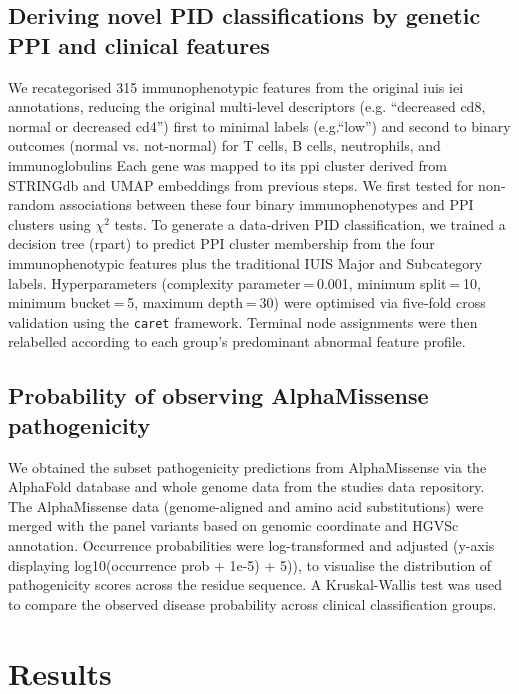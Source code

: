 \subsection{Deriving novel PID classifications by genetic PPI and clinical features}
We recategorised 315 immunophenotypic features from the original \ac{iuis} \ac{iei} annotations, reducing the original multi‐level descriptors (e.g. ``decreased cd8, normal or decreased cd4'') first to 
minimal labels (e.g.``low'') and second to binary outcomes (normal vs. not-normal) for T cells, B cells, neutrophils, and immunoglobulins %
Each gene was mapped to its \ac{ppi} cluster derived from STRINGdb and UMAP embeddings from previous steps. 
We first tested for non‐random associations between these four binary immunophenotypes and PPI clusters using $\chi^2$ tests. %
To generate a data‐driven PID classification, we trained a decision tree (rpart) to predict PPI cluster membership from the four immunophenotypic features plus the traditional IUIS Major and Subcategory labels. Hyperparameters (complexity parameter = 0.001, minimum split = 10, minimum bucket = 5, maximum depth = 30) were optimised via five‐fold cross validation using the \texttt{caret} framework. Terminal node assignments were then relabelled according to each group’s predominant abnormal feature profile.

\subsection{Probability of observing AlphaMissense pathogenicity}
We obtained the subset pathogenicity predictions from AlphaMissense via the AlphaFold database and whole genome data from the studies data repository\cite{cheng_accurate_2023, jun_cheng_2023_8208688}. 
The AlphaMissense data (genome‐aligned and amino acid substitutions) were merged with the panel variants based on genomic coordinate and HGVSc annotation. 
Occurrence probabilities were log-transformed and adjusted (y-axis displaying log10(occurrence prob + 1e-5) + 5)), to visualise the distribution of pathogenicity scores across the residue sequence. 
A Kruskal-Wallis test was used to compare the observed disease probability across clinical classification groups.

\section{Results}

